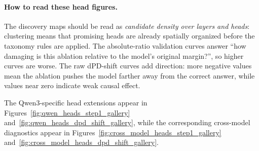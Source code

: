 \paragraph{How to read these head figures.}
The discovery maps should be read as \emph{candidate density over layers and heads}: clustering means that promising heads are already spatially organized before the taxonomy rules are applied. The absolute-ratio validation curves answer ``how damaging is this ablation relative to the model's original margin?'', so higher curves are worse. The raw dPD-shift curves add direction: more negative values mean the ablation pushes the model farther away from the correct answer, while values near zero indicate weak causal effect.

The Qwen3-specific head extensions appear in Figures~\ref{fig:qwen_heads_step1_gallery} and~\ref{fig:qwen_heads_dpd_shift_gallery}, while the corresponding cross-model diagnostics appear in Figures~\ref{fig:cross_model_heads_step1_gallery} and~\ref{fig:cross_model_heads_dpd_shift_gallery}.

